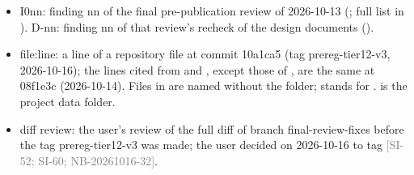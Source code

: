 \documentclass[11pt]{article}
\newcommand{\src}[1]{{\scriptsize\textcolor{gray}{[#1]}}}
\begin{document}
\begin{itemize}
\item I0nn: finding nn of the final pre-publication review of 2026-10-13 (; full list in ). D-nn: finding nn of that review's recheck of the design documents ().
\item file:line: a line of a repository file at commit 10a1ca5 (tag prereg-tier12-v3, 2026-10-16); the lines cited from  and , except those of , are the same at 08f1e3c (2026-10-14). Files in  are named without the folder;  stands for .  is the project data folder.
\item diff review: the user's review of the full diff of branch final-review-fixes before the tag prereg-tier12-v3 was made; the user decided on 2026-10-16 to tag \src{SI-52; SI-60; NB-20261016-32}.
\end{itemize}
\end{document}
